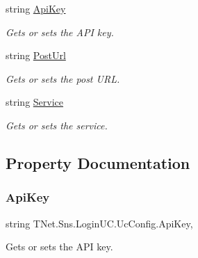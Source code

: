 \begin{DoxyCompactItemize}
string \mbox{\hyperlink{class_t_net_1_1_sns_1_1_login_u_c_1_1_uc_config_a6540d606e752edf73023bc0e9dd51901}{Api\+Key}}
\begin{DoxyCompactList}\small\item\em Gets or sets the A\+PI key. \end{DoxyCompactList}\item 
string \mbox{\hyperlink{class_t_net_1_1_sns_1_1_login_u_c_1_1_uc_config_a95c69898327547980169f9d171ec96a2}{Post\+Url}}
\begin{DoxyCompactList}\small\item\em Gets or sets the post U\+RL. \end{DoxyCompactList}\item 
string \mbox{\hyperlink{class_t_net_1_1_sns_1_1_login_u_c_1_1_uc_config_a93a7869481f25c08adc88fe2ddb0b344}{Service}}
\begin{DoxyCompactList}\small\item\em Gets or sets the service. \end{DoxyCompactList}\end{DoxyCompactItemize}


\subsection{Property Documentation}
\mbox{\label{class_t_net_1_1_sns_1_1_login_u_c_1_1_uc_config_a6540d606e752edf73023bc0e9dd51901}} 
\subsubsection{\texorpdfstring{Api\+Key}{ApiKey}}
{\footnotesize\ttfamily string T\+Net.\+Sns.\+Login\+U\+C.\+Uc\+Config.\+Api\+Key\hspace{0.3cm}{\ttfamily [get]}, {\ttfamily [set]}}



Gets or sets the A\+PI key. 

